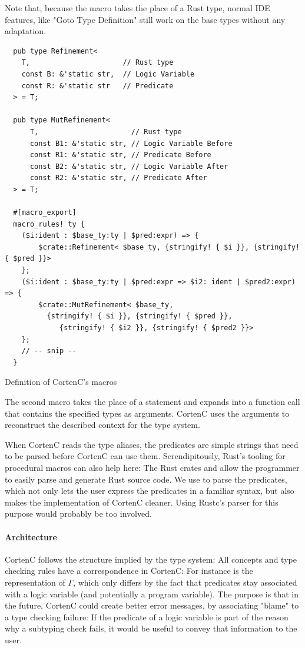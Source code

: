 \documentclass[twoside, english, final]{sdqthesis}
\theoremstyle{definition}
\begin{document}
Note that, because the  macro takes the place of a Rust type, normal IDE features, like "Goto Type Definition" still work on the base types without any adaptation.

\begin{listing}[h]
  \begin{verbatim}
  pub type Refinement<
    T,                      // Rust type
    const B: &'static str,  // Logic Variable
    const R: &'static str   // Predicate
  > = T;

  pub type MutRefinement<
      T,                      // Rust type
      const B1: &'static str, // Logic Variable Before
      const R1: &'static str, // Predicate Before
      const B2: &'static str, // Logic Variable After
      const R2: &'static str, // Predicate After
  > = T;

  #[macro_export]
  macro_rules! ty {
    ($i:ident : $base_ty:ty | $pred:expr) => {
        $crate::Refinement< $base_ty, {stringify! { $i }}, {stringify! { $pred }}>
    };
    ($i:ident : $base_ty:ty | $pred:expr => $i2: ident | $pred2:expr) => {
        $crate::MutRefinement< $base_ty, 
          {stringify! { $i }}, {stringify! { $pred }},
             {stringify! { $i2 }}, {stringify! { $pred2 }}>
    };
    // -- snip --
  }
  \end{verbatim}
  \caption{Definition of CortenC's macros}
  \label{lst:macro-definition}
\end{listing}

The second macro  takes the place of a statement and expands into a function call that contains the specified types as arguments. CortenC uses the arguments to reconstruct the described context for the type system.

When CortenC reads the type aliases, the predicates are simple strings that need to be parsed before CortenC can use them.
Serendipitously, Rust's tooling for procedural macros can also help here: The Rust crates  and  allow the programmer to easily parse and generate Rust source code. We use  to parse the predicates, which not only lets the user express the predicates in a familiar syntax, but also makes the implementation of CortenC cleaner. Using Rustc's parser for this purpose would probably be too involved.

\paragraph{Architecture}
CortenC follows the structure implied by the type system: All concepts and type checking rules have a correspondence in CortenC: For instance  is the representation of $\Gamma$, which only differs by the fact that predicates stay associated with a logic variable (and potentially a program variable). The purpose is that in the future, CortenC could create better error messages, by associating "blame" to a type checking failure: If the predicate of a logic variable is part of the reason why a subtyping check fails, it would be useful to convey that information to the user.
\end{document}

